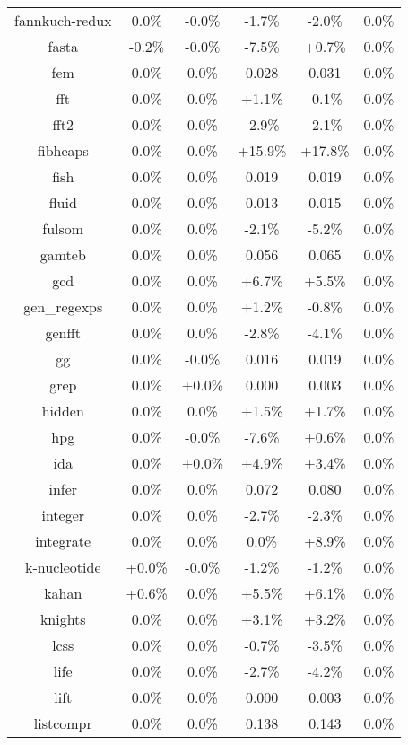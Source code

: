 \begin{tabular}{ c c c c c c }
fannkuch-redux &  0.0\% & -0.0\% & -1.7\% & -2.0\% &  0.0\%\\
fasta & -0.2\% & -0.0\% & -7.5\% & +0.7\% &  0.0\%\\
fem &  0.0\% &  0.0\% & 0.028 & 0.031 &  0.0\%\\
fft &  0.0\% &  0.0\% & +1.1\% & -0.1\% &  0.0\%\\
fft2 &  0.0\% &  0.0\% & -2.9\% & -2.1\% &  0.0\%\\
fibheaps &  0.0\% &  0.0\% & +15.9\% & +17.8\% &  0.0\%\\
fish &  0.0\% &  0.0\% & 0.019 & 0.019 &  0.0\%\\
fluid &  0.0\% &  0.0\% & 0.013 & 0.015 &  0.0\%\\
fulsom &  0.0\% &  0.0\% & -2.1\% & -5.2\% &  0.0\%\\
gamteb &  0.0\% &  0.0\% & 0.056 & 0.065 &  0.0\%\\
gcd &  0.0\% &  0.0\% & +6.7\% & +5.5\% &  0.0\%\\
gen\_regexps &  0.0\% &  0.0\% & +1.2\% & -0.8\% &  0.0\%\\
genfft &  0.0\% &  0.0\% & -2.8\% & -4.1\% &  0.0\%\\
gg &  0.0\% & -0.0\% & 0.016 & 0.019 &  0.0\%\\
grep &  0.0\% & +0.0\% & 0.000 & 0.003 &  0.0\%\\
hidden &  0.0\% &  0.0\% & +1.5\% & +1.7\% &  0.0\%\\
hpg &  0.0\% & -0.0\% & -7.6\% & +0.6\% &  0.0\%\\
ida &  0.0\% & +0.0\% & +4.9\% & +3.4\% &  0.0\%\\
infer &  0.0\% &  0.0\% & 0.072 & 0.080 &  0.0\%\\
integer &  0.0\% &  0.0\% & -2.7\% & -2.3\% &  0.0\%\\
integrate &  0.0\% &  0.0\% &  0.0\% & +8.9\% &  0.0\%\\
k-nucleotide & +0.0\% & -0.0\% & -1.2\% & -1.2\% &  0.0\%\\
kahan & +0.6\% &  0.0\% & +5.5\% & +6.1\% &  0.0\%\\
knights &  0.0\% &  0.0\% & +3.1\% & +3.2\% &  0.0\%\\
lcss &  0.0\% &  0.0\% & -0.7\% & -3.5\% &  0.0\%\\
life &  0.0\% &  0.0\% & -2.7\% & -4.2\% &  0.0\%\\
lift &  0.0\% &  0.0\% & 0.000 & 0.003 &  0.0\%\\
listcompr &  0.0\% &  0.0\% & 0.138 & 0.143 &  0.0\%\\

\end{tabular}
